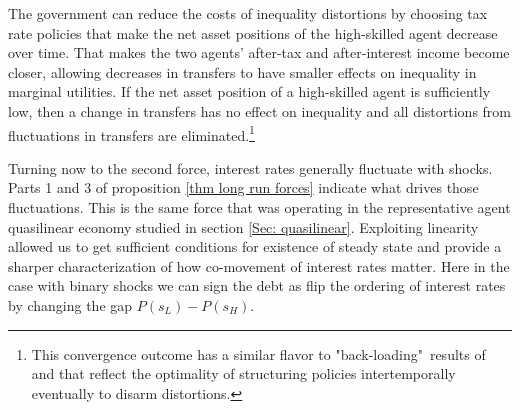 \documentclass[11.5pt,twoside]{article}
\begin{document}
The government can reduce the costs of  inequality distortions by choosing
tax rate policies that make the net asset positions of  the high-skilled agent
decrease over time. That makes the two agents'
after-tax and after-interest income  become closer, allowing decreases in transfers to have smaller effects on inequality in
marginal utilities. If the net asset position of a high-skilled agent is
sufficiently low, then a change in transfers has no effect on inequality and
all  distortions from fluctuations in transfers are eliminated.\footnote{This convergence outcome has
 a similar flavor to "back-loading"\ results  of
 \cite{Ray2002} and \cite{Albanesi2012} that reflect the  optimality of structuring policies intertemporally eventually to disarm  distortions.}




%



Turning now to the second force,  interest rates generally fluctuate
with  shocks.  Parts 1 and 3 of  proposition \ref{thm long run forces} indicate what drives those  fluctuations. This is the same force that was operating in the representative agent quasilinear economy studied in section \ref{Sec: quasilinear}. Exploiting linearity allowed us to get sufficient conditions for existence of steady state and provide a sharper characterization of how co-movement of interest rates matter. Here in the case with binary shocks we can sign the debt as flip the ordering of interest rates by changing the gap $P(s_L)-P(s_H)$. 
\end{document}
